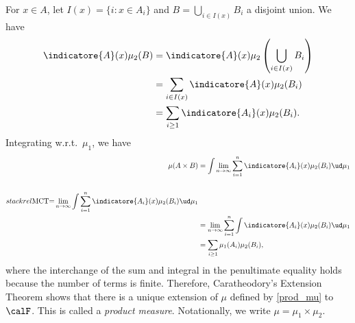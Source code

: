 \documentclass[../aipt.tex]{subfiles}
\begin{document}
For $x \in A$, let $I(x)=\{i:x \in A_i\}$ and $B= \bigcup_{i \in I(x)} {B_i}$ a disjoint union. We have
\begin{align*}
\indicatore{A}(x) \mu_2(B) 
&=\indicatore{A}(x) \mu_2\left(\bigcup_{i \in I(x)} {B_i}\right)\\
&= \sum_{i \in I(x)} \indicatore{A}(x) \mu_2 (B_i)\\
& =\sum_{i\geq 1} \indicatore{A_i}(x) \mu_2 (B_i).
\end{align*}
Integrating w.r.t.\ $\mu_1$, we have
\begin{align*}
\mu (A\times B) 
&=\int \lim_{n \to \infty}{\sum_{i=1}^n {\indicatore{A_i} (x)\mu_2 (B_i) \ud \mu_1}}\\
&\\stackrel{\text{MCT}}{=}\lim_{n \to \infty} \int {\sum_{i=1}^n {\indicatore{A_i} (x)\mu_2 (B_i) \ud \mu_1}}\\
& =\lim_{n \to \infty}\sum_{i=1}^n{\int  \indicatore{A_i} (x)\mu_2 (B_i) \ud \mu_1}\\
& =\sum_{i\geq 1}\mu_1(A_i)\mu_2 (B_i),
\end{align*}
where the interchange of the sum and integral in the penultimate equality holds because the number of terms is finite. Therefore, Caratheodory’s Extension Theorem shows that there is a unique extension of $\mu$ defined by \cref{prod_mu} to $\calF$. This is called a \emph{product measure}. Notationally, we write $\mu = \mu_1 \times \mu_2$.
\end{document}
